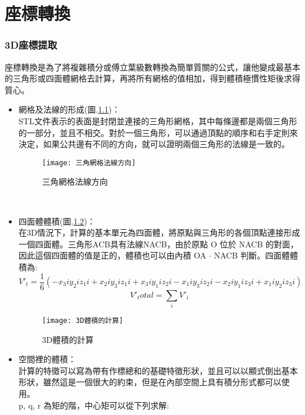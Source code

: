 \chapter{座標轉換}
\subsection{3D座標提取}

座標轉換是為了將複雜積分或傅立葉級數轉換為簡單質關的公式，讓他變成最基本的三角形或四面體網格去計算，再將所有網格的值相加，得到體積極慣性矩後求得質心。\\

\begin{itemize}
\item 網格及法線的形成(圖.\ref{三角網格法線方向})：\\
STL文件表示的表面是封閉並連接的三角形網格，其中每條邊都是兩個三角形的一部分，並且不相交。對於一個三角形，可以通過頂點的順序和右手定則來決定，如果公共邊有不同的方向，就可以證明兩個三角形的法線是一致的。\\
\begin{figure}[hbt!]
\begin{center}
\texttt{[image: 三角網格法線方向]}
\caption{\Large 三角網格法線方向}\label{三角網格法線方向}
\end{center}
\end{figure}
\\
\item 四面體體積(圖.\ref{3D體積的計算})：\\
在3D情況下，計算的基本單元為四面體，將原點與三角形的各個頂點連接形成一個四面體。三角形ACB具有法線NACB，由於原點 O 位於 NACB 的對面，因此這個四面體的值是正的，體積也可以由內積 OA $\cdot$ NACB 判斷。四面體體積為:\\
$$ V'_t = \frac{1}{6}(-x_3i y_2i z_1i + x_2i y_3i z_1i + x_3i y_1i z_2i - x_1i y_3i z_2i - x_2i y_1i z_3i + x_1i y_2i z_3i) $$
$$ V'_total= \sum_{i}V'_i$$

\begin{figure}[hbt!]
\begin{center}
\texttt{[image: 3D體積的計算]}
\caption{\Large 3D體積的計算}\label{3D體積的計算}
\end{center}
\end{figure}
\item 空間裡的體積：\\
計算的特徵可以寫為帶有作標總和的基礎特徵形狀，並且可以以顯式倒出基本形狀，雖然這是一個很大的約束，但是在內部空間上具有積分形式都可以使用。\\
 p, q, r 為矩的階，中心矩可以從下列求解:\\


\end{itemize}
